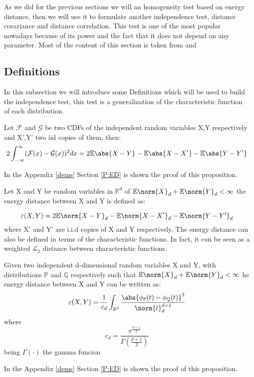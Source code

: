As we did for the previous sections we will an homogeneity test based on energy distance, then we will use it to formulate another independence test, distance covariance and distance correlation. This test is one of the most popular nowadays because of its power and the fact that it does not depend on any parameter. Most of the content of this section is taken from \cite{DCOV_1} and \cite{BrownianCovariance}

\subsection{Definitions}
In this subsection we will introduce some Definitions which will be used to build the independence test, this test is a generalization of the characteristic function of each distribution.

\begin{prop}
Let $\mathcal{F}$ and $\mathcal{G}$ be two CDFs of the independent random variables X,Y respectively and  X',Y' two iid copies of them, then:
\vspace{5mm}
$$
2\int_{-\infty}^{\infty}(\mathcal{F}(x) - \mathcal{G}(x))^{2} dx = 2\mathbb{E}\abs{X-Y} - \mathbb{E}\abs{X-X'} -\mathbb{E}\abs{Y-Y'}  
$$
\end{prop}

In the Appendix \ref{dems} Section \ref{P:ED} is shown the proof of this proposition.

\begin{defn}
Let X and Y be random variables in $\mathbb{R}^{d}$ of $\mathbb{E}\norm{X}_{d} + \mathbb{E}\norm{Y}_{d} < \infty$ the energy distance between X and Y is defined as:

\begin{equation}{}
\varepsilon (X,Y) = 2\mathbb{E}\norm{X-Y}_{d} - \mathbb{E}\norm{X-X'}_{d} - \mathbb{E}\norm{Y-Y'}_{d} 
\end{equation}\label{energy_distance}
where X' and Y' are i.i.d copies of X and Y respectively.
The energy distance can also be defined in terms of the characteristic functions. In fact, it can be seen as a weighted $\mathcal{L}_{2}$ distance between characteristic functions.
\end{defn}
\begin{prop}
Given two independent d-dimensional random variables X and Y, with distributions $\mathbb{P}$ and $\mathbb{Q}$ respectively such that $\mathbb{E}\norm{X}_{d} + \mathbb{E}\norm{Y}_{d} < \infty$ he energy distance between X and Y can be written as:
\vspace{5mm}
$$\varepsilon(X,Y) = \frac{1}{c_{d}}\int_{\mathbb{R}^{d}}\frac{\abs{\phi_{\mathbb{P}}(t)-\phi_{\mathbb{Q}}(t)}^{2}}{\norm{t}^{d+1}_{d}}$$
where
$$c_{d} = \frac{\pi^{\frac{d+1}{2}}}{\Gamma(\frac{d+1}{2})}$$
being $\Gamma(\cdot)$ the gamma funcion
\end{prop} \label{DcovPropRara}
In the Appendix \ref{dems} Section \ref{P:ED} is shown the proof of this proposition.
 
